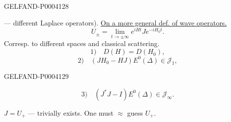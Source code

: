 \begin{GelfandAdjacentEvidence}{GELFAND-P000412}{8}


— different Laplace operators).
\underline{On a more general def. of wave operators.}
\begingroup\color{black}\begin{equation*}
U_\pm=\lim_{t\to\pm\infty}e^{iHt}Je^{-iH_0t}.
\end{equation*}\endgroup
Corresp. to different spaces and classical scattering.
\begingroup\color{black}\begin{equation*}
1)\quad D (H)=D (H_0),
\end{equation*}\endgroup
\begingroup\color{black}\begin{equation*}
2)\quad (JH_0-HJ)E^0(\Delta)\in\mathcal J_1,
\end{equation*}\endgroup
{}
\end{GelfandAdjacentEvidence}
\begin{GelfandAdjacentEvidence}{GELFAND-P000412}{9}


\begingroup\color{black}\begin{equation*}
3)\quad (J^*J-I)E^0(\Delta)\in\mathcal J_\infty.
\end{equation*}\endgroup
{}
\end{GelfandAdjacentEvidence}


$J=U_+$ — trivially exists.
One must $\approx$ guess $U_+$.


